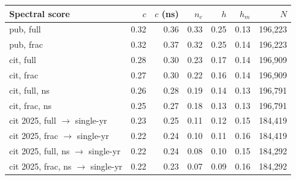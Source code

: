 \begin{tabular}{lrrrrrr}
\toprule
Spectral score & $c$ & $c$ (ns) & $n_c$ & $h$ & $h_m$ & $N$ \\
\midrule
pub, full & 0.32 & 0.36 & 0.33 & 0.25 & 0.13 & 196{,}223 \\
pub, frac & 0.32 & 0.37 & 0.32 & 0.25 & 0.14 & 196{,}223 \\
cit, full & 0.28 & 0.30 & 0.23 & 0.17 & 0.14 & 196{,}909 \\
cit, frac & 0.27 & 0.30 & 0.22 & 0.16 & 0.14 & 196{,}909 \\
cit, full, ns & 0.26 & 0.28 & 0.19 & 0.14 & 0.13 & 196{,}791 \\
cit, frac, ns & 0.25 & 0.27 & 0.18 & 0.13 & 0.13 & 196{,}791 \\
\midrule
cit 2025, full $\to$ single-yr & 0.23 & 0.25 & 0.11 & 0.12 & 0.15 & 184{,}419 \\
cit 2025, frac $\to$ single-yr & 0.22 & 0.24 & 0.10 & 0.11 & 0.16 & 184{,}419 \\
cit 2025, full, ns $\to$ single-yr & 0.22 & 0.24 & 0.08 & 0.10 & 0.15 & 184{,}292 \\
cit 2025, frac, ns $\to$ single-yr & 0.22 & 0.23 & 0.07 & 0.09 & 0.16 & 184{,}292 \\
\bottomrule
\end{tabular}
